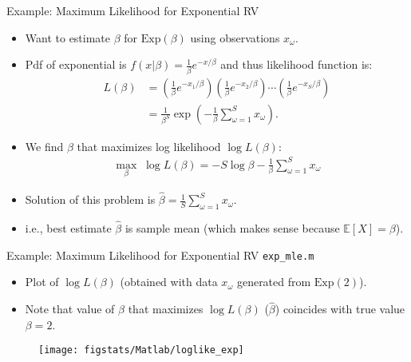 \documentclass[handout,9pt]{beamer}
\begin{document}
%
\begin{frame}{Example: Maximum Likelihood for Exponential RV}

\begin{itemize}
\item Want to estimate $\beta$ for $\textrm{Exp}(\beta)$ using observations $x_\omega$. 
\item Pdf of exponential is $f(x|\beta)=\frac{1}{\beta}e^{-x/\beta}$ and thus likelihood function is:
\begin{align*}
L(\beta)&=\left(\frac{1}{\beta}e^{-x_1/\beta}\right)\left(\frac{1}{\beta}e^{-x_2/\beta}\right)\cdots\left(\frac{1}{\beta}e^{-x_S/\beta}\right)\\
&=\frac{1}{\beta^S}\exp \left(-\frac{1}{\beta}\sum_{\omega=1}^Sx_\omega\right).
\end{align*}
\item We find $\beta$ that maximizes log likelihood $\log L(\beta)$:
\begin{align*}
\max_{\beta}\; \log L(\beta)=-S\log \beta -\frac{1}{\beta}\sum_{\omega=1}^Sx_\omega
\end{align*}
\item Solution of this problem is $\displaystyle\hat{\beta}=\frac{1}{S}\sum_{\omega=1}^Sx_\omega$.
\item i.e., best estimate $\hat{\beta}$ is sample mean (which makes sense because $\mathbb{E}[X]=\beta$). 
\end{itemize}


\end{frame}

%
\begin{frame}{Example: Maximum Likelihood for Exponential RV \footnotesize{\texttt{exp\_mle.m}}}

\begin{itemize}
\setlength{\itemsep}{5pt}
\item Plot of $\log L(\beta)$ (obtained with data $x_\omega$ generated from $\textrm{Exp}(2)$). 
\item Note that value of $\beta$ that maximizes $\log L(\beta)$ ($\hat{\beta}$) coincides with true value $\beta=2$. 
\end{itemize}
\begin{figure}[!htb]
    \centering
	\texttt{[image: figstats/Matlab/loglike\_exp]}
\end{figure}

\end{frame}
\end{document}
